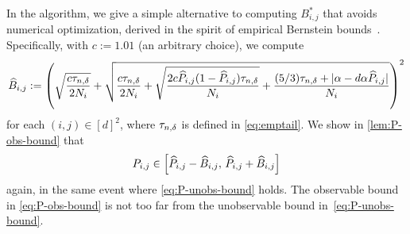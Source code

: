 In the algorithm, we give a simple alternative to computing
$B_{i,j}^*$ that avoids numerical optimization, derived in the spirit
of empirical Bernstein bounds~\citep{audibert2009}.
Specifically, with $c := 1.01$ (an arbitrary choice), we compute
\begin{equation}
  \widehat{B}_{i,j}
  :=
  \left(
    \sqrt{\frac{c\tau_{n,\delta}}{2N_i}}
    + \sqrt{
      \frac{c\tau_{n,\delta}}{2N_i}
      + 
      \sqrt{\frac{2c\widehat{P}_{i,j}(1-\widehat{P}_{i,j})\tau_{n,\delta}}{N_i}}
      + \frac{(5/3)\tau_{n,\delta} + |\alpha-d\alpha\widehat{P}_{i,j}|}{N_i}
    }
  \right)^2
  \label{eq:P-obs-bound}
\end{equation}
for each $(i,j) \in [d]^2$, where $\tau_{n,\delta}$ is defined in
\cref{eq:emptail}.
We show in \cref{lem:P-obs-bound} that
\[
  P_{i,j} \in
  \left[
    \widehat{P}_{i,j} - \widehat{B}_{i,j},\,
    \widehat{P}_{i,j} + \widehat{B}_{i,j}
  \right]
\]
again, in the same event where \cref{eq:P-unobs-bound} holds.
The observable bound in \cref{eq:P-obs-bound} is not too far from the
unobservable bound in~\cref{eq:P-unobs-bound}.

